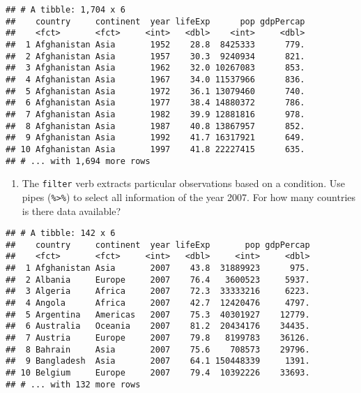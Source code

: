 \documentclass[]{article}
\newenvironment{Shaded}{\begin{snugshade}}{\end{snugshade}}
\newcommand{\KeywordTok}[1]{\textcolor[rgb]{0.13,0.29,0.53}{\textbf{#1}}}
\newcommand{\DecValTok}[1]{\textcolor[rgb]{0.00,0.00,0.81}{#1}}
\newcommand{\StringTok}[1]{\textcolor[rgb]{0.31,0.60,0.02}{#1}}
\newcommand{\OperatorTok}[1]{\textcolor[rgb]{0.81,0.36,0.00}{\textbf{#1}}}
\newcommand{\NormalTok}[1]{#1}
\providecommand{\tightlist}{%
  \setlength{\itemsep}{0pt}\setlength{\parskip}{0pt}}
\begin{document}
\begin{verbatim}
## # A tibble: 1,704 x 6
##    country     continent  year lifeExp      pop gdpPercap
##    <fct>       <fct>     <int>   <dbl>    <int>     <dbl>
##  1 Afghanistan Asia       1952    28.8  8425333      779.
##  2 Afghanistan Asia       1957    30.3  9240934      821.
##  3 Afghanistan Asia       1962    32.0 10267083      853.
##  4 Afghanistan Asia       1967    34.0 11537966      836.
##  5 Afghanistan Asia       1972    36.1 13079460      740.
##  6 Afghanistan Asia       1977    38.4 14880372      786.
##  7 Afghanistan Asia       1982    39.9 12881816      978.
##  8 Afghanistan Asia       1987    40.8 13867957      852.
##  9 Afghanistan Asia       1992    41.7 16317921      649.
## 10 Afghanistan Asia       1997    41.8 22227415      635.
## # ... with 1,694 more rows
\end{verbatim}

\begin{enumerate}
\def\labelenumi{\arabic{enumi}.}
\setcounter{enumi}{1}
\tightlist
\item
  The \texttt{filter} verb extracts particular observations based on a
  condition. Use pipes (\texttt{\%\textgreater{}\%}) to select all
  information of the year 2007. For how many countries is there data
  available?
\end{enumerate}

\begin{Shaded}
\end{Shaded}

\begin{verbatim}
## # A tibble: 142 x 6
##    country     continent  year lifeExp       pop gdpPercap
##    <fct>       <fct>     <int>   <dbl>     <int>     <dbl>
##  1 Afghanistan Asia       2007    43.8  31889923      975.
##  2 Albania     Europe     2007    76.4   3600523     5937.
##  3 Algeria     Africa     2007    72.3  33333216     6223.
##  4 Angola      Africa     2007    42.7  12420476     4797.
##  5 Argentina   Americas   2007    75.3  40301927    12779.
##  6 Australia   Oceania    2007    81.2  20434176    34435.
##  7 Austria     Europe     2007    79.8   8199783    36126.
##  8 Bahrain     Asia       2007    75.6    708573    29796.
##  9 Bangladesh  Asia       2007    64.1 150448339     1391.
## 10 Belgium     Europe     2007    79.4  10392226    33693.
## # ... with 132 more rows
\end{verbatim}
\end{document}
